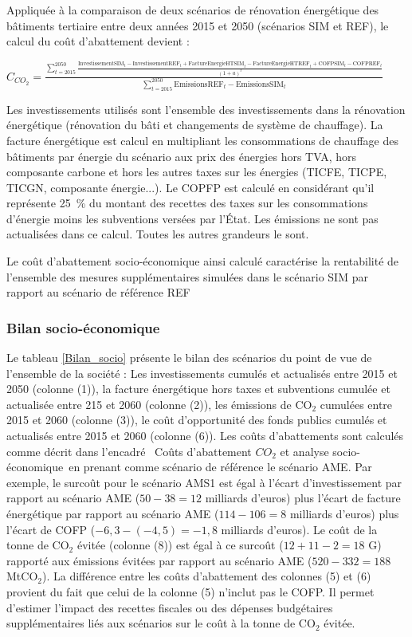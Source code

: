 \documentclass[10.5pt,a4paper]{article}
\def\euro{\mbox{\raisebox{.25ex}{{\it =}}\hspace{-.5em}{\sf C}}}
\begin{document}
{{{Appliquée à la comparaison de deux scénarios de rénovation énergétique des bâtiments tertiaire entre deux années 2015 et 2050 (scénarios SIM et REF), le calcul du coût d'abattement devient : 

$C_{CO_2} = \frac{
\sum_{t=2015}^{2050} \frac{\textrm{InvestissementSIM}_t -\textrm{InvestissementREF}_t  + \textrm{FactureEnergieHTSIM}_t - \textrm{FactureEnergieHTREF}_t + \textrm{COFPSIM}_t - \textrm{COFPREF}_t}{(1+a)^t}}{\sum_{t=2015}^{2050} \textrm{EmissionsREF}_t-\textrm{EmissionsSIM}_t} $ 

Les investissements utilisés sont l'ensemble des investissements dans la rénovation énergétique (rénovation du bâti et changements de système de chauffage). La facture énergétique est calcul en multipliant les consommations de chauffage des bâtiments par énergie du scénario aux prix des énergies hors TVA, hors composante carbone et hors les autres taxes sur les énergies (TICFE, TICPE, TICGN, composante énergie...).  Le COPFP est calculé en considérant qu'il représente 25~\% du montant des recettes des taxes sur les consommations d'énergie moins les subventions versées par l’État. Les émissions ne sont pas actualisées dans ce calcul. Toutes les autres grandeurs le sont.

Le coût d'abattement socio-économique ainsi calculé caractérise la rentabilité de l'ensemble des mesures supplémentaires simulées dans le scénario SIM par rapport au scénario de référence REF

}}
\newpage 

\subsubsection{Bilan socio-économique}

Le tableau \ref{Bilan_socio} présente le bilan des scénarios du point de vue de l'ensemble de la société : Les investissements cumulés et actualisés entre 2015 et 2050 (colonne (1)), la facture énergétique hors taxes et subventions cumulée et actualisée entre 215 et 2060 (colonne (2)), les émissions de CO$_2$ cumulées entre 2015 et 2060 (colonne (3)), le coût d'opportunité des fonds publics cumulés et actualisés entre 2015 et 2060 (colonne (6)). Les coûts d'abattements sont calculés comme décrit dans l'encadré \og~Coûts d’abattement $CO_2$ et analyse socio-économique~\fg en prenant comme scénario de référence le scénario AME. Par exemple, le surcoût pour le scénario AMS1 est égal à l'écart d'investissement par rapport au scénario AME ($50 - 38 = 12$ milliards d'euros) plus l'écart de facture énergétique par rapport au scénario AME ($114 - 106 = 8$ milliards d'euros) plus l'écart de COFP ($-6,3 - (-4,5) = -1,8$ milliards d'euros). Le coût de la tonne de CO$_2$ évitée (colonne (8)) est égal à ce surcoût ($12+11-2= 18$ G\euro)  rapporté aux émissions évitées par rapport au scénario AME ($520 - 332 = 188$ MtCO$_2$). La différence entre les coûts d'abattement des colonnes (5) et (6) provient du fait que celui de la colonne (5) n'inclut pas le COFP. Il permet d'estimer l'impact des recettes fiscales ou des dépenses budgétaires supplémentaires liés aux scénarios sur le coût à la tonne de CO$_2$ évitée. 

}
\end{document}

